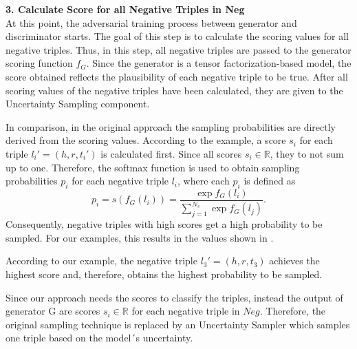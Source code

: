\textbf{3. Calculate Score for all Negative Triples in Neg}\\
At this point, the adversarial training process between generator and discriminator starts.
The goal of this step is to calculate the scoring values for all negative triples.
Thus, in this step, all negative triples are passed to the generator scoring function $f_G$.
Since the generator is a tensor factorization-based model, the score obtained reflects the plausibility of each negative triple to be true.
After all scoring values of the negative triples have been calculated, they are given to the Uncertainty Sampling component.

In comparison, in the original \kbgan approach the sampling probabilities are directly derived from the scoring values. 
According to the example, a score $s_i$ for each triple $l_i' = (h,r,t_i')$ is calculated first.
Since all scores $s_i \in \mathbb{R}$, they to not sum up to one.
Therefore, the softmax function is used to obtain sampling probabilities $p_i$ for each negative triple $l_i$, where each $p_i$ is defined as
\begin{equation}
    p_i = s(f_G(l_i)) = \frac{\exp{f_G(l_i)}}{\sum_{j=1}^{N_s}{\exp{f_G(l_j)}}}.
\end{equation}
Consequently, negative triples with high scores get a high probability to be sampled.
For our examples, this results in the values shown in .

According to our example, the negative triple $l_3' = (h,r,t_3)$ achieves the highest score and, therefore, obtains the highest probability to be sampled.


Since our approach needs the scores to classify the triples, instead the output of generator G are scores $s_i \in \mathbb{R}$ for each negative triple in $Neg$.
Therefore, the original sampling technique is replaced by an Uncertainty Sampler which samples one triple based on the model´s uncertainty.


